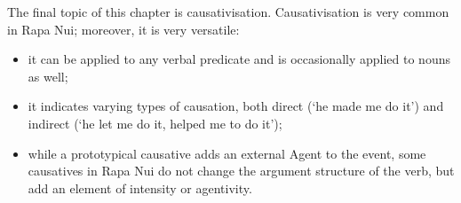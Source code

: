 \largerpage[2]
The final topic of this chapter is causativisation. Causativisation is very common in Rapa Nui; moreover, it is very versatile: 

\begin{itemize}
\item 
it can be applied to any verbal predicate and is occasionally applied to nouns as well; 

\item 
it indicates varying types of causation, both direct (‘he made me do it’) and indirect (‘he let me do it, helped me to do it’);

\item 
while a prototypical causative adds an external Agent to the event, some causatives in Rapa Nui do not change the argument structure of the verb, but add an element of intensity or agentivity.

\end{itemize}
